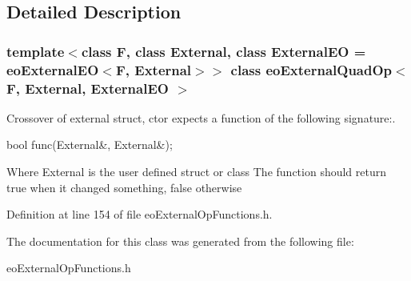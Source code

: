 \subsection{Detailed Description}
\subsubsection*{template$<$class F, class External, class External\-EO = eo\-External\-EO$<$F, External$>$$>$ class eo\-External\-Quad\-Op$<$ F, External, External\-EO $>$}

Crossover of external struct, ctor expects a function of the following signature:. 

bool func(External\&, External\&);

Where External is the user defined struct or class The function should return true when it changed something, false otherwise 



Definition at line 154 of file eo\-External\-Op\-Functions.h.

The documentation for this class was generated from the following file:\begin{CompactItemize}
\item 
eo\-External\-Op\-Functions.h\end{CompactItemize}
